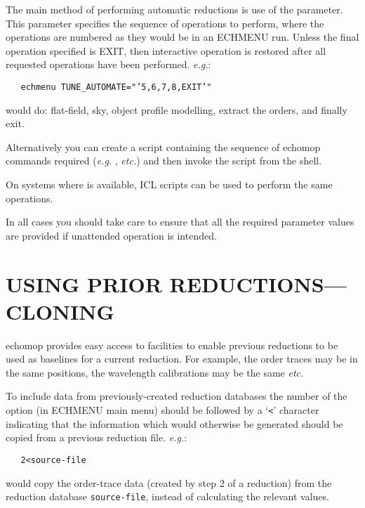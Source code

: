 The main method of performing automatic reductions is use of the
 parameter.
This parameter
specifies the sequence of operations to perform, where the operations
are numbered as they would be in an ECHMENU run.  Unless the final
operation specified is EXIT, then interactive operation is restored
after all requested operations have been performed. {\it{e.g.}}:

\verb+   echmenu +{\tt TUNE\_AUTOMATE="'5,6,7,8,EXIT'"}

would do: flat-field, sky, object profile modelling, extract the orders,
and finally exit.

Alternatively you can create a script containing the sequence of {\sc echomop}
commands required ({\it{e.g.}} ,
 {\it etc.}) and then invoke
the script from the shell.

On systems where  is available, ICL scripts can be used to
perform the same operations.

In all cases you should take care to ensure that all the required parameter
values are provided if unattended operation is intended.


\section{USING PRIOR REDUCTIONS---CLONING}

{\sc echomop} provides easy access to facilities to enable previous
reductions to be used as baselines for a current reduction. For
example, the order traces may be in the same positions, the
wavelength calibrations may be the same {\it etc.}

To include data from previously-created reduction databases the number
of the option (in ECHMENU main menu) should be followed by a `\verb+<+'
character indicating that the information which would otherwise be
generated should be copied from a previous reduction file. {\it{e.g.}}:

\verb+   2<source-file+

would copy the order-trace data (created by step 2 of a reduction) from the
reduction database \verb+source-file+, instead of calculating the relevant
values.

